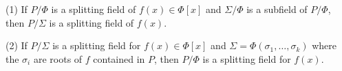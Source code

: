 (1) If $P/\Phi$ is a splitting field of $f(x) \in \Phi[x]$ and $\Sigma/\Phi$ is a subfield of $P/\Phi$, then $P/\Sigma$ is a splitting field of $f(x)$.

(2) If $P/\Sigma$ is a splitting field for $f(x) \in \Phi[x]$ and $\Sigma = \Phi(\sigma_1, \dots, \sigma_k)$ where the $\sigma_i$ are roots of $f$ contained in $P$, then $P/\Phi$ is a splitting field for $f(x)$.
